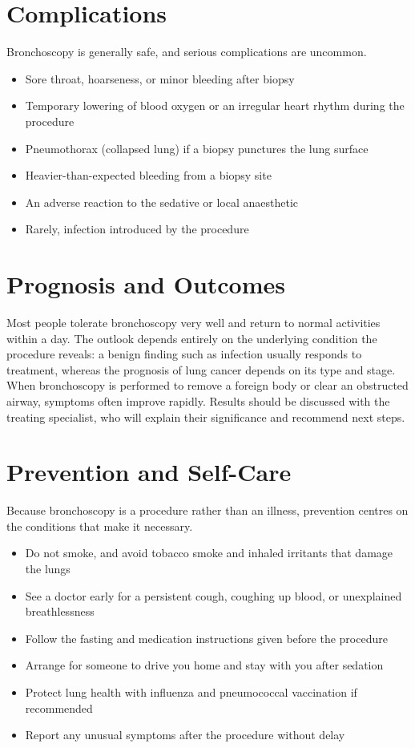 \section*{Complications}
Bronchoscopy is generally safe, and serious complications are uncommon.

\begin{itemize}
    \item Sore throat, hoarseness, or minor bleeding after biopsy
    \item Temporary lowering of blood oxygen or an irregular heart rhythm during the procedure
    \item Pneumothorax (collapsed lung) if a biopsy punctures the lung surface
    \item Heavier-than-expected bleeding from a biopsy site
    \item An adverse reaction to the sedative or local anaesthetic
    \item Rarely, infection introduced by the procedure
\end{itemize}

\section*{Prognosis and Outcomes}
Most people tolerate bronchoscopy very well and return to normal activities within a day. The outlook depends entirely on the underlying condition the procedure reveals: a benign finding such as infection usually responds to treatment, whereas the prognosis of lung cancer depends on its type and stage. When bronchoscopy is performed to remove a foreign body or clear an obstructed airway, symptoms often improve rapidly. Results should be discussed with the treating specialist, who will explain their significance and recommend next steps.

\section*{Prevention and Self-Care}
Because bronchoscopy is a procedure rather than an illness, prevention centres on the conditions that make it necessary.

\begin{itemize}
    \item Do not smoke, and avoid tobacco smoke and inhaled irritants that damage the lungs
    \item See a doctor early for a persistent cough, coughing up blood, or unexplained breathlessness
    \item Follow the fasting and medication instructions given before the procedure
    \item Arrange for someone to drive you home and stay with you after sedation
    \item Protect lung health with influenza and pneumococcal vaccination if recommended
    \item Report any unusual symptoms after the procedure without delay
\end{itemize}

